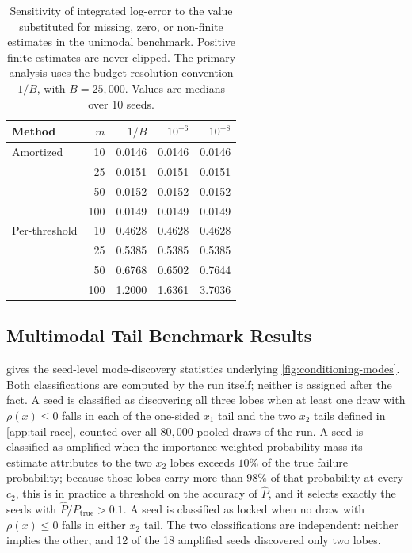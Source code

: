 \begin{table}[ht!]
    \centering
    \caption{
    Sensitivity of integrated log-error to the value substituted for missing, zero, or non-finite estimates in the unimodal benchmark. Positive finite estimates are never clipped. The primary analysis uses the budget-resolution convention $1/B$, with $B=25{,}000$. Values are medians over 10 seeds.
    }
    \label{tab:exp1-floor-sensitivity}
    \begin{tabular}{@{}lrrrr@{}}
        \toprule
        Method & $m$ & $1/B$ & $10^{-6}$ & $10^{-8}$ \\
        \midrule
        Amortized
            & 10  & 0.0146 & 0.0146 & 0.0146 \\
            & 25  & 0.0151 & 0.0151 & 0.0151 \\
            & 50  & 0.0152 & 0.0152 & 0.0152 \\
            & 100 & 0.0149 & 0.0149 & 0.0149 \\
        \midrule
        Per-threshold
            & 10  & 0.4628 & 0.4628 & 0.4628 \\
            & 25  & 0.5385 & 0.5385 & 0.5385 \\
            & 50  & 0.6768 & 0.6502 & 0.7644 \\
            & 100 & 1.2000 & 1.6361 & 3.7036 \\
        \bottomrule
    \end{tabular}
\end{table}

\subsection{Multimodal Tail Benchmark Results}
\label{app:tail-benchmark-results}

 gives the seed-level mode-discovery statistics underlying \cref{fig:conditioning-modes}. Both classifications are computed by the run itself; neither is assigned after the fact. A seed is classified as discovering all three lobes when at least one draw with $\rho(x)\leq 0$ falls in each of the one-sided $x_1$ tail and the two $x_2$ tails defined in \cref{app:tail-race}, counted over all $80{,}000$ pooled draws of the run. A seed is classified as amplified when the importance-weighted probability mass its estimate attributes to the two $x_2$ lobes exceeds $10\%$ of the true failure probability; because those lobes carry more than $98\%$ of that probability at every $c_2$, this is in practice a threshold on the accuracy of $\widehat P$, and it selects exactly the seeds with $\widehat P/P_{\mathrm{true}}>0.1$. A seed is classified as locked when no draw with $\rho(x)\leq 0$ falls in either $x_2$ tail. The two classifications are independent: neither implies the other, and 12 of the 18 amplified seeds discovered only two lobes. 

